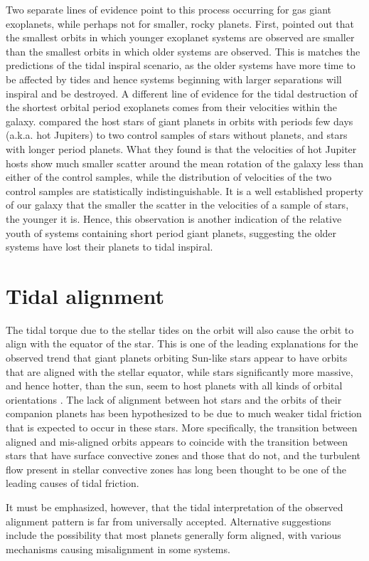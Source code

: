 Two separate lines of evidence point to this process occurring for gas giant
exoplanets, while perhaps not for smaller, rocky planets. First,
\citep{Jackson_et_al_09} pointed out that the smallest orbits in which younger
exoplanet systems are observed are smaller than the smallest orbits in which
older systems are observed. This is matches the predictions of the tidal
inspiral scenario, as the older systems have more time to be affected by tides
and hence systems beginning with larger separations will inspiral and be
destroyed. A different line of evidence for the tidal destruction of the
shortest orbital period exoplanets comes from their velocities within the
galaxy. \citep{Hamer_Schlaufman_19} compared the host stars of giant planets in
orbits with periods few days (a.k.a. hot Jupiters) to two control samples of
stars without planets, and stars with longer period planets. What they found is
that the velocities of hot Jupiter hosts show much smaller scatter around the
mean rotation of the galaxy less than either of the control samples, while the
distribution of velocities of the two control samples are statistically
indistinguishable. It is a well established property of our galaxy that the
smaller the scatter in the velocities of a sample of stars, the younger it is.
Hence, this observation is another indication of the relative youth of systems
containing short period giant planets, suggesting the older systems have lost
their planets to tidal inspiral.

\section{Tidal alignment}

The tidal torque due to the stellar tides on the orbit will also cause the orbit
to align with the equator of the star. This is one of the leading explanations
for the observed trend that giant planets orbiting Sun-like stars appear to
have orbits that are aligned with the stellar equator, while stars significantly
more massive, and hence hotter, than the sun, seem to host planets with all
kinds of orbital orientations \citep[c.f. chapter 5.2 of][]{Winn_Fabrycky_2015}.
The lack of alignment between hot stars and the orbits of their companion
planets has been hypothesized to be due to much weaker tidal friction that is
expected to occur in these stars. More specifically, the transition between
aligned and mis-aligned orbits appears to coincide with the transition between
stars that have surface convective zones and those that do not, and the
turbulent flow present in stellar convective zones has long been thought to be
one of the leading causes of tidal friction.

It must be emphasized, however, that the tidal interpretation of the observed
alignment pattern is far from universally accepted.  Alternative suggestions
include the possibility that most planets generally form aligned, with various
mechanisms causing misalignment in some systems.
